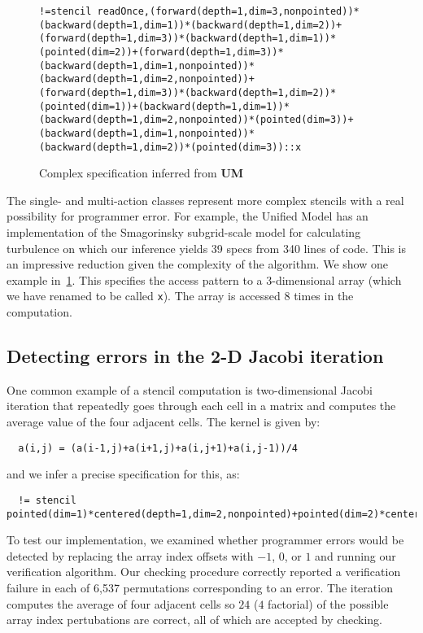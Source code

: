 \documentclass[10pt,preprint,numbers]{sigplanconf}
\theoremstyle{definition}
\begin{document}
\begin{figure}[t]\begin{verbatim}
!=stencil readOnce,(forward(depth=1,dim=3,nonpointed))*(backward(depth=1,dim=1))*(backward(depth=1,dim=2))+(forward(depth=1,dim=3))*(backward(depth=1,dim=1))*(pointed(dim=2))+(forward(depth=1,dim=3))*(backward(depth=1,dim=1,nonpointed))*(backward(depth=1,dim=2,nonpointed))+(forward(depth=1,dim=3))*(backward(depth=1,dim=2))*(pointed(dim=1))+(backward(depth=1,dim=1))*(backward(depth=1,dim=2,nonpointed))*(pointed(dim=3))+(backward(depth=1,dim=1,nonpointed))*(backward(depth=1,dim=2))*(pointed(dim=3))::x
\end{verbatim}
\caption{Complex specification inferred from
  \textbf{UM}\label{fig:smagorinsky}}
\vspace{-1em}
\end{figure}

The single- and multi-action classes represent more complex stencils
with a real possibility for programmer error. For example, the Unified
Model has an implementation of the Smagorinsky subgrid-scale model for
calculating turbulence on which our inference yields 39 specs from 340
lines of code. This is an impressive reduction given
the complexity of the algorithm.  We show one example in~\cref{fig:smagorinsky}. This specifies the access pattern to
a 3-dimensional array (which we have renamed to be called
\texttt{x}). The array is accessed 8 times in the computation.

\subsection{Detecting errors in the 2-D Jacobi iteration}

One common example of a stencil computation is two-dimensional
Jacobi iteration that repeatedly goes through each cell in a matrix
and computes the average value of the four adjacent cells. The kernel
is given by:
\begin{verbatim}
  a(i,j) = (a(i-1,j)+a(i+1,j)+a(i,j+1)+a(i,j-1))/4
\end{verbatim}
and we infer a precise specification for this, as:
\begin{verbatim}
  != stencil pointed(dim=1)*centered(depth=1,dim=2,nonpointed)+pointed(dim=2)*centered(depth=1,dim=1,nonpointed)::a
\end{verbatim}
%
To test our implementation, 
we examined whether programmer errors would be detected by replacing
the array index offsets with $-1$, $0$, or $1$ and running our
verification algorithm. Our checking procedure correctly reported a verification
failure in each of 6,537 permutations corresponding to an error.  
The iteration computes the average of four adjacent
cells so $24$ ($4$ factorial) of the possible array index pertubations
are correct, all of which are accepted by checking.
\end{document}
